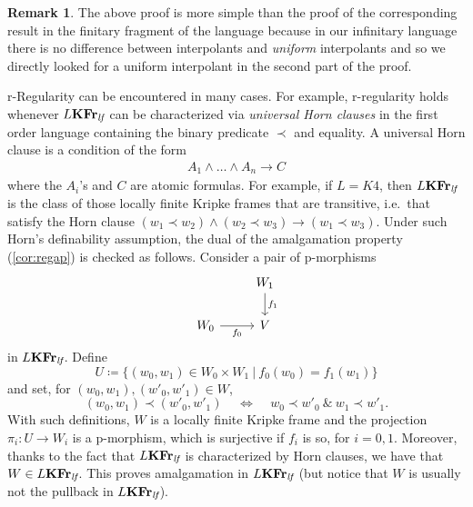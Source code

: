 \documentclass{article}
\theoremstyle{definition}
\newtheorem{rem}{Remark}
\newcommand{\KFr}{\textup{\textbf{KFr}}}
\newcommand{\lf}{\textit{lf}}
\begin{document}
\begin{rem}
The above proof is  more simple than the proof of the corresponding result in the finitary fragment of the language
because  in our infinitary language there is no difference between interpolants and \emph{uniform} interpolants and so we directly looked for a uniform interpolant in the second part of the proof.
\end{rem}

r-Regularity can be encountered in many cases. For example, r-regularity holds whenever $L\KFr_\lf$ can be characterized via \emph{universal Horn clauses} in the first order language containing the binary predicate $\prec$ and equality.
A universal Horn clause is a condition of the form
\begin{align*}%
    A_1 \wedge \dots \wedge A_n \to C%
\end{align*}
where the $A_i$'s and $C$ are atomic formulas. For example, if $L = K4$, then $L\KFr_\lf$ is the class of those locally finite Kripke frames that are transitive, i.e.\ that satisfy the Horn clause $(w_1 \prec w_2) \wedge (w_2 \prec w_3) \to (w_1 \prec w_3)$. %
Under such Horn's definability assumption,  the dual of the amalgamation property (\cref{cor:regap}) is checked as follows. Consider a pair of p-morphisms
\[\begin{tikzcd}[ampersand replacement=\&]
	\& W_1 \\
	W_0 \& V
	\arrow["f_1", from=1-2, to=2-2]
	\arrow["f_0"', from=2-1, to=2-2]
\end{tikzcd}\]
in $L\KFr_\lf$. Define
$$U \coloneqq \{(w_0,w_1) \in W_0 \times W_1\ \vert\ f_0(w_0) = f_1(w_1)\}$$
and set, for $(w_0,w_1), (w'_0,w'_1) \in W$,
$$(w_0,w_1) \prec (w'_0,w'_1) ~~~~~\iff~~~~~ w_0 \prec w'_0 ~\&~ w_1 \prec w'_1.$$
With such definitions, $W$ is a locally finite Kripke frame and the projection $\pi_i \colon U \longrightarrow W_i$ is a p-morphism, which is surjective if $f_i$ is so, for $i = 0, 1$. Moreover, thanks to the fact that $L\KFr_\lf$ is characterized by Horn clauses, we have that $W \in L\KFr_\lf$.
This proves amalgamation in $L\KFr_\lf$ (but notice that $W$ is usually not the pullback in $L\KFr_\lf$).
\end{document}
